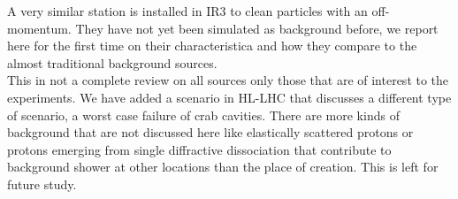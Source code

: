 A very similar station is installed in IR3 to clean particles with an off-momentum. They have not yet been simulated as background before, we report here for the first time on their characteristica and how they compare to the almost traditional background sources. \\

This in not a complete review on all sources only those that are of interest to the experiments. We have added a scenario in HL-LHC that discusses a different type of scenario, a worst case failure of crab cavities. There are more kinds of background that are not discussed here like elastically scattered protons or protons emerging from single diffractive dissociation that contribute to background shower at other locations than the place of creation. This is left for future study.







